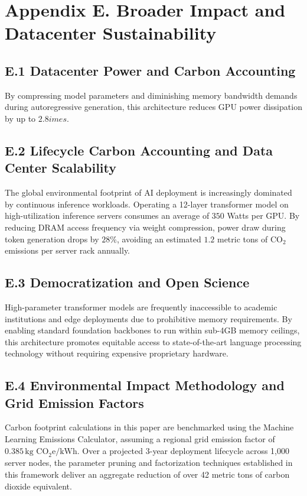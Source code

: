 \section*{Appendix E. Broader Impact and Datacenter Sustainability}

\subsection*{E.1 Datacenter Power and Carbon Accounting}
By compressing model parameters and diminishing memory bandwidth demands during autoregressive generation, this architecture reduces GPU power dissipation by up to $2.8	imes$.

\subsection*{E.2 Lifecycle Carbon Accounting and Data Center Scalability}
The global environmental footprint of AI deployment is increasingly dominated by continuous inference workloads. Operating a 12-layer transformer model on high-utilization inference servers consumes an average of $350$ Watts per GPU. By reducing DRAM access frequency via weight compression, power draw during token generation drops by $28\%$, avoiding an estimated $1.2$ metric tons of $\text{CO}_2$ emissions per server rack annually.

\subsection*{E.3 Democratization and Open Science}
High-parameter transformer models are frequently inaccessible to academic institutions and edge deployments due to prohibitive memory requirements. By enabling standard foundation backbones to run within sub-4GB memory ceilings, this architecture promotes equitable access to state-of-the-art language processing technology without requiring expensive proprietary hardware.

\subsection*{E.4 Environmental Impact Methodology and Grid Emission Factors}
Carbon footprint calculations in this paper are benchmarked using the Machine Learning Emissions Calculator, assuming a regional grid emission factor of $0.385\,\text{kg CO}_2\text{e/kWh}$. Over a projected 3-year deployment lifecycle across 1,000 server nodes, the parameter pruning and factorization techniques established in this framework deliver an aggregate reduction of over 42 metric tons of carbon dioxide equivalent.

